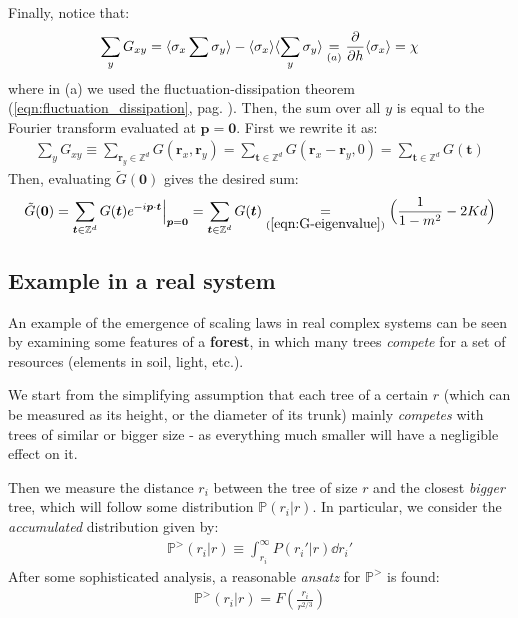 \documentclass[../../main.tex]{subfiles}
\begin{document}
Finally, notice that:
\begin{align*}
    \sum_y G_{xy} = \langle \sigma_x \sum \sigma_y \rangle - \langle \sigma_x \rangle \langle \sum_y \sigma_y \rangle \underset{\substack{(a)}}{=}  \pdv{h} \langle \sigma_x \rangle = \chi
\end{align*}
where in (a) we used the fluctuation-dissipation theorem (\ref{eqn:fluctuation_dissipation}, pag. \pageref{eqn:fluctuation_dissipation}). Then, the sum over all $y$ is equal to the Fourier transform evaluated at $\bm{p} = \bm{0}$. First we rewrite it as:
\begin{align*}
    \sum_{y} G_{xy} \equiv \sum_{\bm{r}_y \in \mathbb{Z}^d} G(\bm{r}_x, \bm{r}_y) = \sum_{\bm{t} \in \mathbb{Z}^d} G(\bm{r}_x-\bm{r}_y, 0) = \sum_{\bm{t} \in \mathbb{Z}^d} G(\bm{t})
\end{align*}
Then, evaluating $\tilde{G}(\bm{0})$ gives the desired sum:
\begin{align*}
    \tilde{G}(\bm{0}) = \sum_{\bm{t} \in \mathbb{Z}^d} G(\bm{t}) e^{-i \bm{p} \cdot \bm{t}} \Big|_{\bm{p} = \bm{0}} = \sum_{\bm{t} \in \mathbb{Z}^d} G(\bm{t}) \underset{(\ref{eqn:G-eigenvalue})}{=}  \Big(\frac{1}{1-m^2} - 2 Kd\Big) 
\end{align*}

\subsection{Example in a real system}
An example of the emergence of scaling laws in real complex systems can be seen by examining some features of a \textbf{forest}, in which many trees \textit{compete} for a set of resources (elements in soil, light, etc.).

\medskip

We start from the simplifying assumption that each tree of a certain  $r$ (which can be measured as its height, or the diameter of its trunk) mainly \textit{competes} with trees of similar or bigger size - as everything much smaller will have a negligible effect on it.

Then we measure the distance $r_i$ between the tree of size $r$ and the closest \textit{bigger} tree, which will follow some distribution $\mathbb{P}(r_i|r)$. In particular, we consider the \textit{accumulated} distribution given by:
\begin{align*}
    \mathbb{P}^>(r_i|r) \equiv \int_{r_i}^\infty P(r_i'|r) \dd{r_i'}
\end{align*} 
After some sophisticated analysis, a reasonable \textit{ansatz} for $\mathbb{P}^>$ is found:
\begin{align}\label{eqn:tree-ansatz}
    \mathbb{P}^>(r_i|r) = F\left(\frac{r_i}{r^{2/3}} \right)
\end{align} 
\end{document}
